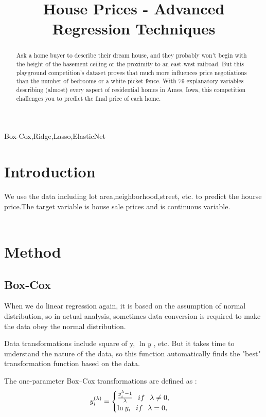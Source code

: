 \documentclass[conference]{IEEEtran}
\begin{document}
\title{House Prices - Advanced Regression Techniques\\
{\footnotesize}}

\author{
\and
{}}
\maketitle

\begin{abstract}
Ask a home buyer to describe their dream house, and they probably won't begin with the height of the basement ceiling or the proximity to an east-west railroad. But this playground competition's dataset proves that much more influences price negotiations than the number of bedrooms or a white-picket fence.
With 79 explanatory variables describing (almost) every aspect of residential homes in Ames, Iowa, this competition challenges you to predict the final price of each home.
\end{abstract}

\begin{IEEEkeywords}
Box-Cox,Ridge,Lasso,ElasticNet
\end{IEEEkeywords}

\section{Introduction}
We use the data including lot area,neighborhood,street, etc. to predict the hourse price.The target variable is house sale prices and is continuous variable.\\
\\
\section{Method}
\subsection{Box-Cox}
When we do linear regression again, it is based on the assumption of normal distribution, so in actual analysis, sometimes data conversion is required to make the data obey the normal distribution.

Data transformations include square of y, $\ln_{}{y}$ , etc. But it takes time to understand the nature of the data, so this function automatically finds the "best" transformation function based on the data.

The one-parameter Box–Cox transformations are defined as :
$$y_i^{(\lambda)} =
\begin{cases}
\frac{y^{\lambda}_{_i}-1}{\lambda}  \hspace{0.25cm} if \hspace{0.25cm}\lambda \neq 0,
\\
\ln_{}{y_i} \hspace{0.25cm} if \hspace{0.25cm}\lambda = 0,
\\
\end{cases}$$
\end{document}
